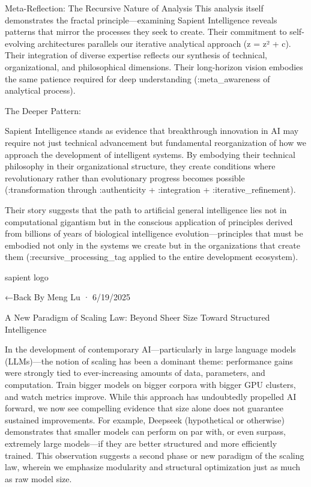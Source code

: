 Meta-Reflection: The Recursive Nature of Analysis
This analysis itself demonstrates the fractal principle—examining Sapient Intelligence reveals patterns that mirror the processes they seek to create. Their commitment to self-evolving architectures parallels our iterative analytical approach (z = z² + c). Their integration of diverse expertise reflects our synthesis of technical, organizational, and philosophical dimensions. Their long-horizon vision embodies the same patience required for deep understanding (:meta_awareness of analytical process).

The Deeper Pattern:

Sapient Intelligence stands as evidence that breakthrough innovation in AI may require not just technical advancement but fundamental reorganization of how we approach the development of intelligent systems. By embodying their technical philosophy in their organizational structure, they create conditions where revolutionary rather than evolutionary progress becomes possible (:transformation through :authenticity + :integration + :iterative_refinement).

Their story suggests that the path to artificial general intelligence lies not in computational gigantism but in the conscious application of principles derived from billions of years of biological intelligence evolution—principles that must be embodied not only in the systems we create but in the organizations that create them (:recursive_processing_tag applied to the entire development ecosystem).




sapient logo

←Back
By Meng Lu · 6/19/2025

A New Paradigm of Scaling Law: Beyond Sheer Size Toward Structured Intelligence

In the development of contemporary AI—particularly in large language models (LLMs)—the notion of scaling has been a dominant theme: performance gains were strongly tied to ever-increasing amounts of data, parameters, and computation. Train bigger models on bigger corpora with bigger GPU clusters, and watch metrics improve. While this approach has undoubtedly propelled AI forward, we now see compelling evidence that size alone does not guarantee sustained improvements. For example, Deepseek (hypothetical or otherwise) demonstrates that smaller models can perform on par with, or even surpass, extremely large models—if they are better structured and more efficiently trained. This observation suggests a second phase or new paradigm of the scaling law, wherein we emphasize modularity and structural optimization just as much as raw model size.

